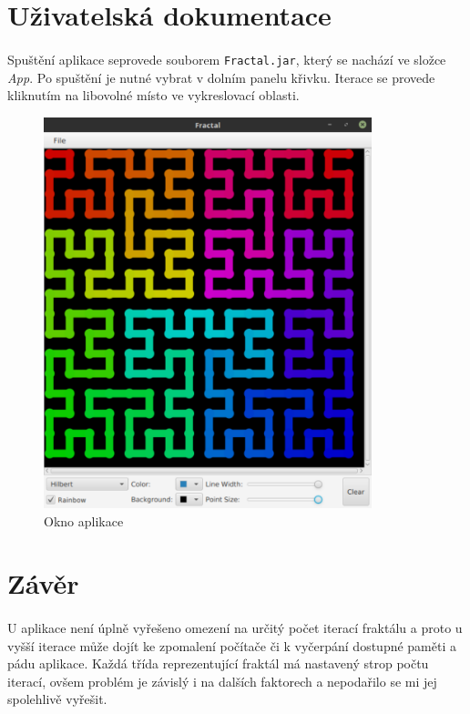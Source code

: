 \documentclass[12pt]{scrartcl}
\begin{document}
\newpage
\section{Uživatelská dokumentace}

\paragraph{}
Spuštění aplikace se\nobreakspace provede souborem \texttt{Fractal.jar}, který se nachází ve složce \emph{App}. Po spuštění je nutné vybrat v dolním panelu křivku. Iterace se provede kliknutím na libovolné místo ve vykreslovací oblasti.

\begin{figure}[!ht]
	\centering
	\includegraphics[width=0.85\textwidth,natwidth=1,natheight=1]{app_gui.pdf}
	\caption{Okno aplikace}
\end{figure}

\newpage
\section{Závěr}
\paragraph{}
U aplikace není úplně vyřešeno omezení na určitý počet iterací fraktálu a proto u vyšší iterace může dojít ke zpomalení počítače či k vyčerpání dostupné paměti a pádu aplikace. Každá třída reprezentující fraktál má nastavený strop počtu iterací, ovšem problém je závislý  i na dalších faktorech a nepodařilo se mi jej spolehlivě vyřešit.
\end{document}
